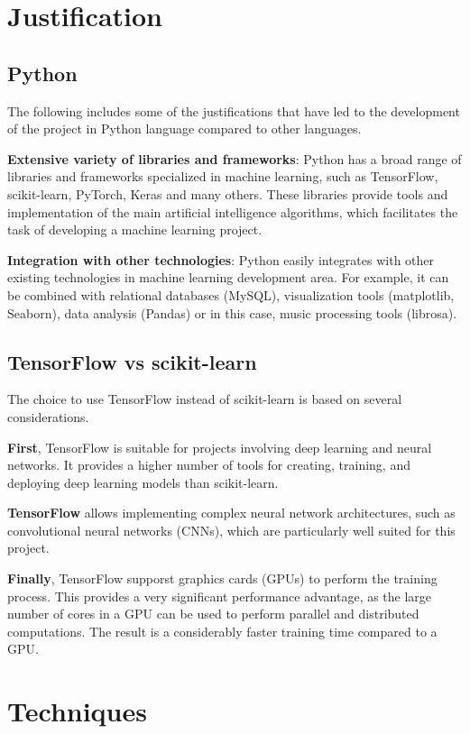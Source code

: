 \section{Justification}

\subsection{Python}
The following includes some of the justifications that have led to the development of the project in Python language compared to other languages.

\textbf{Extensive variety of libraries and frameworks}: Python has a broad range of libraries and frameworks specialized in machine learning, such as TensorFlow, scikit-learn, PyTorch, Keras and many others. 
These libraries provide tools and implementation of the main artificial intelligence algorithms, which facilitates the task of developing a machine learning project.

\textbf{Integration with other technologies}: Python easily integrates with other existing technologies in machine learning development area. For example, it can be combined with relational databases (MySQL), visualization tools (matplotlib, Seaborn), data analysis (Pandas) or in this case, music processing tools (librosa).

\subsection{TensorFlow vs scikit-learn}
The choice to use TensorFlow instead of scikit-learn is based on several considerations.

\textbf{First}, TensorFlow is suitable for projects involving deep learning and neural networks. It provides a higher number of tools for creating, training, and deploying deep learning models than scikit-learn. 

\textbf{TensorFlow} allows implementing complex neural network architectures, such as convolutional neural networks (CNNs), which are particularly well suited for this project.

\textbf{Finally}, TensorFlow supporst graphics cards (GPUs) to perform the training process. This provides a very significant performance advantage, as the large number of cores in a GPU can be used to perform parallel and distributed computations. The result is a considerably faster training time compared to a GPU.

\section{Techniques}

